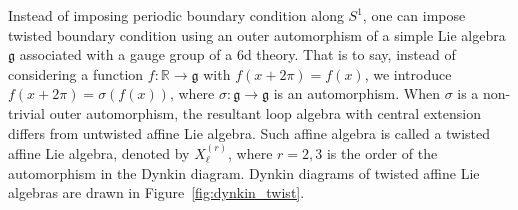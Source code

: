 Instead of imposing periodic boundary condition along $S^1$, one can impose twisted boundary condition using an outer automorphism of a simple Lie algebra $\mathfrak{g}$ associated with a gauge group of a 6d theory. That is to say, instead of considering a function $ f : \mathbb{R} \to \mathfrak{g} $ with $ f(x + 2\pi) = f(x) $, we introduce $ f(x + 2\pi) = \sigma(f(x)) $, where $ \sigma : \mathfrak{g} \to \mathfrak{g} $ is an automorphism. When $ \sigma $ is a non-trivial outer automorphism, the resultant loop algebra with central extension differs from untwisted affine Lie algebra. Such affine algebra is called a twisted affine Lie algebra, denoted by $ X_\ell^{(r)} $, where $ r = 2, 3 $ is the order of the automorphism in the Dynkin diagram. Dynkin diagrams of twisted affine Lie algebras are drawn in Figure~\ref{fig:dynkin_twist}.

